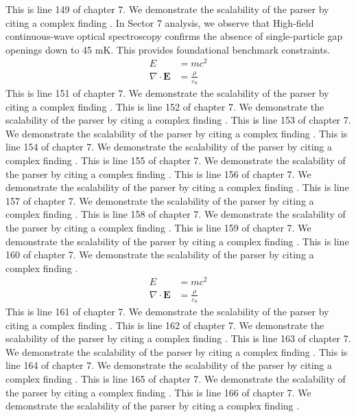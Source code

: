 This is line 149 of chapter 7. We demonstrate the scalability of the parser by citing a complex finding \cite{ref7_149}.
In Sector 7 analysis, we observe that High-field continuous-wave optical spectroscopy confirms the absence of single-particle gap openings down to 45 mK. This provides foundational benchmark constraints.
\begin{align*}
  E &= mc^2 \\
  \nabla \cdot \mathbf{E} &= \frac{\rho}{\varepsilon_0}
\end{align*}
This is line 151 of chapter 7. We demonstrate the scalability of the parser by citing a complex finding \cite{ref7_151}.
This is line 152 of chapter 7. We demonstrate the scalability of the parser by citing a complex finding \cite{ref7_152}.
This is line 153 of chapter 7. We demonstrate the scalability of the parser by citing a complex finding \cite{ref7_153}.
This is line 154 of chapter 7. We demonstrate the scalability of the parser by citing a complex finding \cite{ref7_154}.
This is line 155 of chapter 7. We demonstrate the scalability of the parser by citing a complex finding \cite{ref7_155}.
This is line 156 of chapter 7. We demonstrate the scalability of the parser by citing a complex finding \cite{ref7_156}.
This is line 157 of chapter 7. We demonstrate the scalability of the parser by citing a complex finding \cite{ref7_157}.
This is line 158 of chapter 7. We demonstrate the scalability of the parser by citing a complex finding \cite{ref7_158}.
This is line 159 of chapter 7. We demonstrate the scalability of the parser by citing a complex finding \cite{ref7_159}.
This is line 160 of chapter 7. We demonstrate the scalability of the parser by citing a complex finding \cite{ref7_160}.
\begin{align*}
  E &= mc^2 \\
  \nabla \cdot \mathbf{E} &= \frac{\rho}{\varepsilon_0}
\end{align*}
This is line 161 of chapter 7. We demonstrate the scalability of the parser by citing a complex finding \cite{ref7_161}.
This is line 162 of chapter 7. We demonstrate the scalability of the parser by citing a complex finding \cite{ref7_162}.
This is line 163 of chapter 7. We demonstrate the scalability of the parser by citing a complex finding \cite{ref7_163}.
This is line 164 of chapter 7. We demonstrate the scalability of the parser by citing a complex finding \cite{ref7_164}.
This is line 165 of chapter 7. We demonstrate the scalability of the parser by citing a complex finding \cite{ref7_165}.
This is line 166 of chapter 7. We demonstrate the scalability of the parser by citing a complex finding \cite{ref7_166}.
